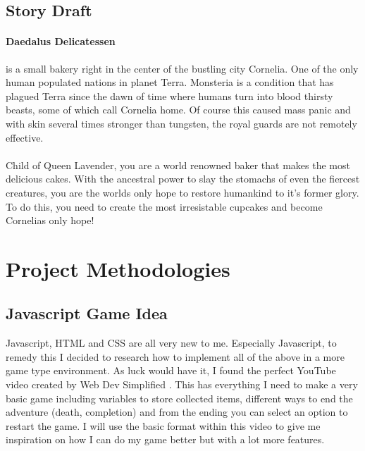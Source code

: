 \documentclass[10pt, a4paper]{article}
\begin{document}
	\subsection{Story Draft}
	\paragraph{Daedalus Delicatessen} is a small bakery right in the center of the bustling city Cornelia. One of the only
	human populated nations in planet Terra. Monsteria is a condition that has plagued Terra since the dawn of time where
	humans turn into blood thirsty beasts, some of which call Cornelia home. Of course this caused mass panic and with skin
	several times stronger than tungsten, the royal guards are not remotely effective. \\ 
	\\
	\hspace{5mm} Child of Queen Lavender, you are a world renowned baker that makes the most delicious cakes. With the
	ancestral power to slay the stomachs of even the fiercest creatures, you are the worlds only hope to restore humankind
	to it's former glory. To do this, you need to create the most irresistable cupcakes and become Cornelias only hope!
	
	\section{Project Methodologies}
	\subsection{Javascript Game Idea}
	Javascript, HTML and CSS are all very new to me. Especially Javascript, to remedy this I decided to research how to implement all of the above in a more game type environment. As	luck would have it, I found the perfect YouTube video created by Web Dev Simplified	\cite{JavascriptGame}. This has everything I need to make a very basic game including	variables to store collected items, different ways to end the adventure (death, completion) and from the ending you can select an option to restart the game. I will use the basic format within this video to give me inspiration on how I can do my game better but with a lot more features.
	
\end{document}
